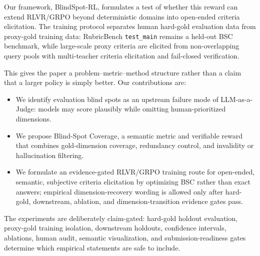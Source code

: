 Our framework, BlindSpot-RL, formulates a test of whether this reward can
extend RLVR/GRPO beyond deterministic domains into open-ended
criteria elicitation. The
training protocol separates human hard-gold evaluation data from proxy-gold
training data: RubricBench \texttt{test\_main} remains a held-out BSC benchmark,
while large-scale proxy criteria are elicited from non-overlapping query pools
with multi-teacher criteria elicitation and fail-closed verification.

This gives the paper a problem--metric--method structure rather than a claim
that a larger policy is simply better. Our contributions are:
\begin{itemize}
  \item We identify evaluation blind spots as an upstream failure mode of
  LLM-as-a-Judge: models may score plausibly while omitting human-prioritized
  dimensions.
  \item We propose Blind-Spot Coverage, a semantic metric and verifiable reward
  that combines gold-dimension coverage, redundancy control, and invalidity or
  hallucination filtering.
  \item We formulate an evidence-gated RLVR/GRPO training route for
  open-ended, semantic, subjective criteria elicitation by optimizing
  BSC rather than exact answers; empirical dimension-recovery wording is
  allowed only after hard-gold, downstream, ablation, and dimension-transition
  evidence gates pass.
\end{itemize}

The experiments are deliberately claim-gated: hard-gold holdout evaluation,
proxy-gold training isolation, downstream holdouts, confidence intervals,
ablations, human audit, semantic visualization, and submission-readiness gates
determine which empirical statements are safe to include.
